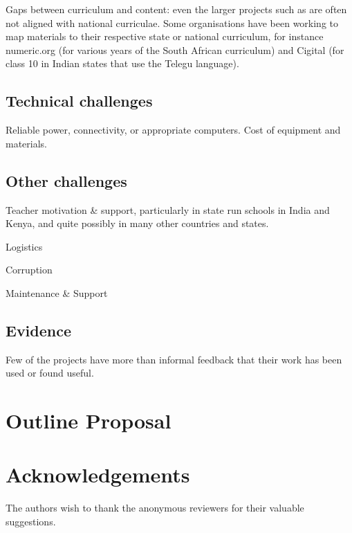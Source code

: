 \documentclass[11pt]{IEEEtran}
\begin{document}
Gaps between curriculum and content: even the larger projects such as \cite{khanacademy} are often not aligned with national curriculae. Some organisations have been working to map materials to their respective state or national curriculum, for instance numeric.org (for various years of the South African curriculum) and Cigital (for class 10 in Indian states that use the Telegu language).

\subsection*{Technical challenges}
Reliable power, connectivity, or appropriate computers. Cost of equipment and materials.

\subsection*{Other challenges}
Teacher motivation & support, particularly in state run schools in India and Kenya, and quite possibly in many other countries and states.

Logistics

Corruption

Maintenance & Support

\subsection*{Evidence}
Few of the projects have more than informal feedback that their work has been used or found useful. 

\section*{Outline Proposal}

\nocite{*}


\section*{Acknowledgements}
The authors wish to thank the anonymous reviewers for their valuable
suggestions.

\printbibliography
\end{document}
